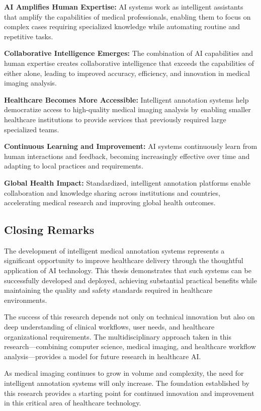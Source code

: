 \textbf{AI Amplifies Human Expertise:} AI systems work as intelligent assistants that amplify the capabilities of medical professionals, enabling them to focus on complex cases requiring specialized knowledge while automating routine and repetitive tasks.

\textbf{Collaborative Intelligence Emerges:} The combination of AI capabilities and human expertise creates collaborative intelligence that exceeds the capabilities of either alone, leading to improved accuracy, efficiency, and innovation in medical imaging analysis.

\textbf{Healthcare Becomes More Accessible:} Intelligent annotation systems help democratize access to high-quality medical imaging analysis by enabling smaller healthcare institutions to provide services that previously required large specialized teams.

\textbf{Continuous Learning and Improvement:} AI systems continuously learn from human interactions and feedback, becoming increasingly effective over time and adapting to local practices and requirements.

\textbf{Global Health Impact:} Standardized, intelligent annotation platforms enable collaboration and knowledge sharing across institutions and countries, accelerating medical research and improving global health outcomes.

\subsection{Closing Remarks}

The development of intelligent medical annotation systems represents a significant opportunity to improve healthcare delivery through the thoughtful application of AI technology. This thesis demonstrates that such systems can be successfully developed and deployed, achieving substantial practical benefits while maintaining the quality and safety standards required in healthcare environments.

The success of this research depends not only on technical innovation but also on deep understanding of clinical workflows, user needs, and healthcare organizational requirements. The multidisciplinary approach taken in this research—combining computer science, medical imaging, and healthcare workflow analysis—provides a model for future research in healthcare AI.

As medical imaging continues to grow in volume and complexity, the need for intelligent annotation systems will only increase. The foundation established by this research provides a starting point for continued innovation and improvement in this critical area of healthcare technology.

